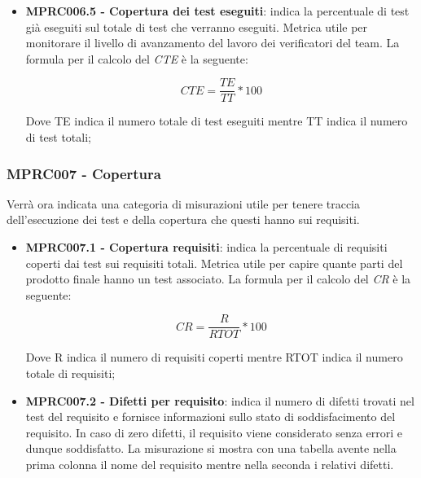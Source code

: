 {\begin{itemize}
    \begin{center}
        \begin{displaymath}
            CD = \frac{DT}{DTU} * 100
        \end{displaymath}
    \end{center}
    Dove DT indica il numero totale di difetti trovati nella fase di test mentre DTU indica la somma dei difetti trovati nei test e quelli trovati durante l'uso del software;
    \item \textbf{MPRC006.5 - Copertura dei test eseguiti}: indica la percentuale di test già eseguiti sul totale di test che verranno eseguiti. Metrica utile per monitorare il livello di avanzamento del lavoro dei verificatori del team. La formula per il calcolo del \textit{CTE} è la seguente:
    \begin{center}
        \begin{displaymath}
            CTE = \frac{TE}{TT} * 100
        \end{displaymath}
    \end{center}
    Dove TE indica il numero totale di test eseguiti mentre TT indica il numero di test totali;
\end{itemize}
\subsubsection{MPRC007 - Copertura}
Verrà ora indicata una categoria di misurazioni utile per tenere traccia dell'esecuzione dei test e della copertura che questi hanno sui requisiti.

\begin{itemize}
    \item \textbf{MPRC007.1 - Copertura requisiti}: indica la percentuale di requisiti coperti dai test sui requisiti totali. Metrica utile per capire quante parti del prodotto finale hanno un test associato. La formula per il calcolo del \textit{CR} è la seguente:
    \begin{center}
        \begin{displaymath}
            CR = \frac{R}{RTOT} * 100
        \end{displaymath}
    \end{center}
    Dove R indica il numero di requisiti coperti mentre RTOT indica il numero totale di requisiti;
    \item \textbf{MPRC007.2 - Difetti per requisito}: indica il numero di difetti trovati nel test del requisito e fornisce informazioni sullo stato di soddisfacimento del requisito. In caso di zero difetti, il requisito viene considerato senza errori e dunque soddisfatto. La misurazione si mostra con una tabella avente nella prima colonna il nome del requisito mentre nella seconda i relativi difetti.
\end{itemize}

}
